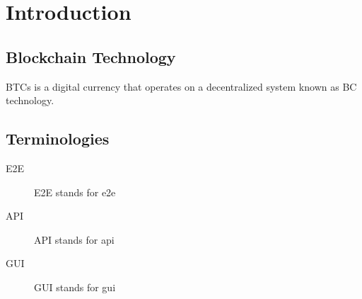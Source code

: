 \documentclass{article}
\begin{document}
\section{Introduction}

\subsection{Blockchain Technology} \Glspl{BTC} is a digital currency that operates on a decentralized system known as \gls{BC} technology.

\subsection{Terminologies} \begin{description} \item[E2E] E2E stands for \gls{e2e} \item[API] API stands for \gls{api} \item[GUI] GUI stands for \gls{gui} \end{description}

\printglossaries
\end{document}
